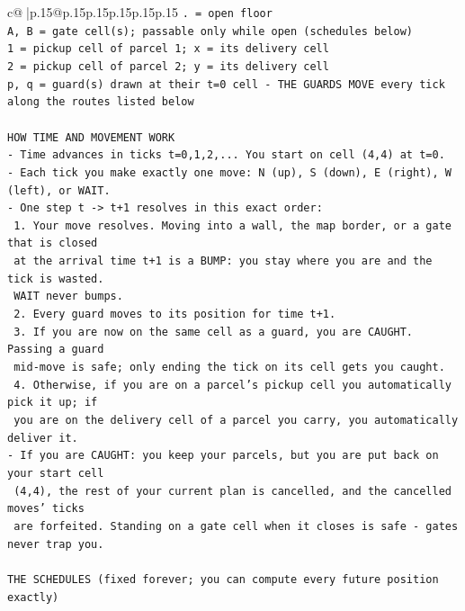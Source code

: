 \documentclass{article}
\begin{document}
{\begin{supertabular}{c@{$\;$}|p{.15\linewidth}@{}p{.15\linewidth}p{.15\linewidth}p{.15\linewidth}p{.15\linewidth}p{.15\linewidth}}
{{{\texttt{. = open floor} \\
\texttt{A, B = gate cell(s); passable only while open (schedules below)} \\
\texttt{1 = pickup cell of parcel 1; x = its delivery cell} \\
\texttt{2 = pickup cell of parcel 2; y = its delivery cell} \\
\texttt{p, q = guard(s) drawn at their t=0 cell {-} THE GUARDS MOVE every tick along the routes listed below} \\
\\ 
\texttt{HOW TIME AND MOVEMENT WORK} \\
\texttt{{-} Time advances in ticks t=0,1,2,... You start on cell (4,4) at t=0.} \\
\texttt{{-} Each tick you make exactly one move: N (up), S (down), E (right), W (left), or WAIT.} \\
\texttt{{-} One step t {-}> t+1 resolves in this exact order:} \\
\texttt{  1. Your move resolves. Moving into a wall, the map border, or a gate that is closed} \\
\texttt{     at the arrival time t+1 is a BUMP: you stay where you are and the tick is wasted.} \\
\texttt{     WAIT never bumps.} \\
\texttt{  2. Every guard moves to its position for time t+1.} \\
\texttt{  3. If you are now on the same cell as a guard, you are CAUGHT. Passing a guard} \\
\texttt{     mid{-}move is safe; only ending the tick on its cell gets you caught.} \\
\texttt{  4. Otherwise, if you are on a parcel's pickup cell you automatically pick it up; if} \\
\texttt{     you are on the delivery cell of a parcel you carry, you automatically deliver it.} \\
\texttt{{-} If you are CAUGHT: you keep your parcels, but you are put back on your start cell} \\
\texttt{  (4,4), the rest of your current plan is cancelled, and the cancelled moves' ticks} \\
\texttt{  are forfeited. Standing on a gate cell when it closes is safe {-} gates never trap you.} \\
\\ 
\texttt{THE SCHEDULES (fixed forever; you can compute every future position exactly)} \\
}}}
\end{supertabular}}
\end{document}
